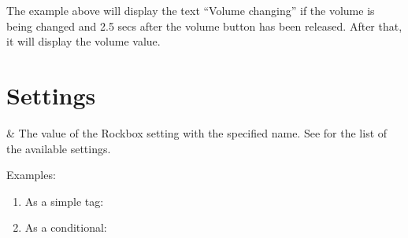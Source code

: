 The example above will display the text ``Volume changing'' if the volume is
being changed and 2.5 secs after the volume button has been released. After
that, it will display the volume value.

\section{Settings}
\begin{table}
  \begin{tagmap}{}{}
     & The value of the Rockbox
             setting with the specified name. See 
             for the list of the available settings.\\
  \end{tagmap}
\end{table}

Examples:
\begin{enumerate}
\item As a simple tag: 
\item As a conditional: 
\end{enumerate}



